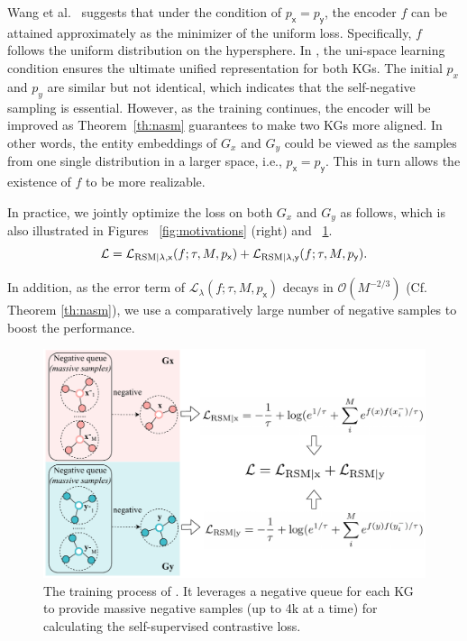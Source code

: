 Wang et al.~\cite{wang2020understanding} suggests that under the condition of $p_\mathsf{x}=p_\mathsf{y}$, the encoder $f$ can be attained approximately as the minimizer of the uniform loss.  
Specifically, $f$ follows the uniform distribution on the hypersphere. 
In \solution, the uni-space learning condition ensures the ultimate unified representation for both KGs. 
The initial $p_x$ and $p_y$ are similar but not identical, which indicates that the self-negative sampling is essential. 
However, as the training continues, the encoder will be improved as Theorem~\ref{th:nasm} guarantees to make two KGs more aligned. 
In other words, the entity embeddings of $G_x$ and $G_y$ could be viewed as the samples from one single distribution in a larger space, i.e., $p_\mathsf{x}=p_\mathsf{y}$. 
This in turn allows the existence of $f$ to be more realizable.

In practice, we jointly optimize the loss on both ${G_x}$ and ${G_y}$ as follows, which is also illustrated in Figures ~\ref{fig:motivations} (right) and ~\ref{fig:modelflow}. 
\begin{equation} 
    \mathcal{L}=\mathcal{L}_{{\rm RSM|}\lambda,\mathsf{x}}(f;\tau,M,p_{\mathsf x}) + \mathcal{L}_{{\rm RSM|}\lambda,\mathsf{y}}(f;\tau,M,p_{\mathsf y}).
    \label{eq:xy}
\end{equation}

In addition, as the error term of $\mathcal{L}_\lambda(f;\tau,M,p_{\mathsf x})$ decays in $\mathcal{O}(M^{-2/3})$ (Cf. Theorem \ref{th:nasm}), we use a comparatively large number of negative samples to boost the performance. 



\begin{figure}[t]
\centering   
\includegraphics[width=0.99\columnwidth]{img/architecture_new3.pdf}
\caption{The training process of \solution. 
\textmd{It leverages a negative queue for each KG to provide massive negative samples (up to 4k at a time) for calculating the self-supervised contrastive loss.}
}
\label{fig:modelflow}
\vspace{-3mm}
\end{figure}



